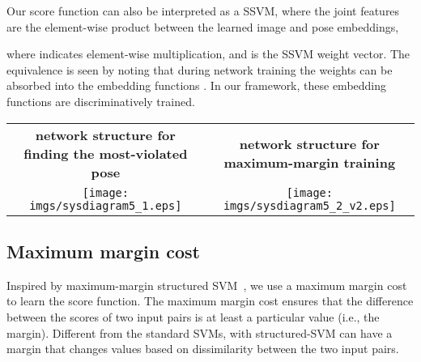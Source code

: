 \documentclass[10pt,twocolumn,letterpaper]{article}
\begin{document}
Our score function can also be interpreted as a SSVM, where the joint features
are the element-wise product between the learned image and pose embeddings, 

where  indicates element-wise multiplication, and   is the SSVM weight vector.  
The equivalence is seen by noting that during network training the  weights  can be absorbed into the embedding functions .
In our framework, these embedding functions are discriminatively trained.
 

\begin{figure*}[t]
\begin{center}     
\begin{tabular}{c|c}
{\footnotesize \bf network structure for finding the most-violated pose}
&
{\footnotesize \bf network structure for maximum-margin training}
\\
   \texttt{[image: imgs/sysdiagram5\_1.eps]}
   &
  \texttt{[image: imgs/sysdiagram5\_2\_v2.eps]}
\end{tabular} 
\end{center}  
\vspace{-0.15in}
   \caption{(left) Network structure for calculating the most violated pose.  For a given image, the score values are predicted for a set of candidate poses.  The re-scaling margin values are added, and the largest value is selected as the most-violated pose. Thick arrows represent an array of outputs, with each entry corresponding to one candidate pose.
 (right) Network structure for maximum-margin training. Given the most-violated pose, the margin cost and pose prediction cost are calculated, and the gradients are passed back through the network.}
\label{fig:trainnet}
\vspace{-0.15in}
\end{figure*}
 

\subsection{Maximum margin cost}
\vspace{-0.05in}
Inspired by maximum-margin structured SVM~\cite{ssvm2005}, we use a maximum margin cost to learn the score function.
The maximum margin cost ensures that the difference between the scores of two input pairs is at least a particular value (i.e., the margin). Different from the standard SVMs, with structured-SVM can have a margin that changes values based on dissimilarity between the two input pairs.
\end{document}
